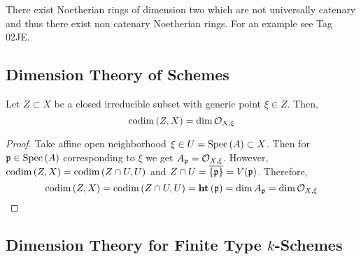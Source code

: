 \documentclass[12pt]{article}
\begin{document}
\begin{example}
There exist Noetherian rings of dimension two which are not universally catenary and thus there exist non catenary Noetherian rings. For an example see Tag 02JE.
\end{example}

\subsection{Dimension Theory of Schemes}

\begin{lemma} \label{codimension_loc_rings}
Let $Z \subset X$ be a closed irreducible subset with generic point $\xi \in Z$. Then,
\[ \mathrm{codim}\left( Z,X \right) = \dim{\mathcal{O}_{X, \xi}} \]
\end{lemma}


\begin{proof}
Take affine open neighborhood $\xi \in U = \mathrm{Spec}\left( A \right) \subset X$. Then for $\mathfrak{p} \in \mathrm{Spec}\left( A \right)$ corresponding to $\xi$ we get $A_{\mathfrak{p}} = \mathcal{O}_{X, \xi}$. However, $\mathrm{codim}\left( Z, X \right) = \mathrm{codim}\left( Z \cap U, U \right)$ and $Z \cap U = \overline{\{ \mathfrak{p} \}} = V(\mathfrak{p})$. Therefore,
\[ \mathrm{codim}\left( Z, X \right) = \mathrm{codim}\left( Z \cap U, U \right) = \mathbf{ht}\left( \mathfrak{p} \right) = \dim{A_{\mathfrak{p}}} = \dim{\mathcal{O}_{X, \xi}} \]
\end{proof}

\subsection{Dimension Theory for Finite Type $k$-Schemes}
\end{document}

